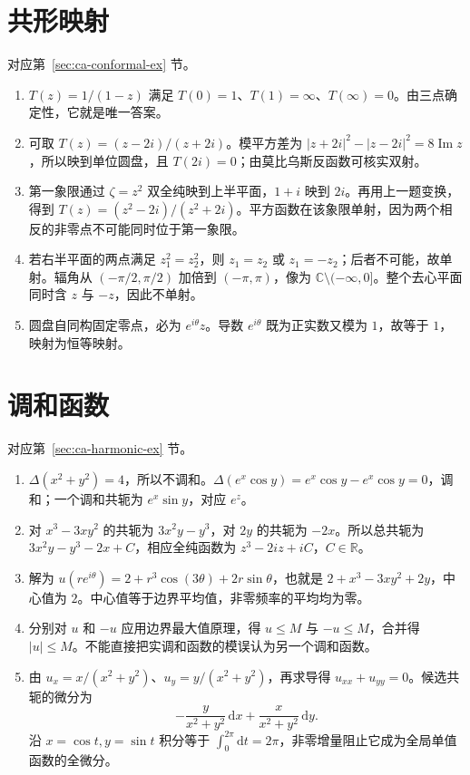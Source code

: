 \section{共形映射}
对应第~\ref{sec:ca-conformal-ex} 节。
\begin{enumerate}
 \item $T(z)=1/(1-z)$ 满足 $T(0)=1$、$T(1)=\infty$、$T(\infty)=0$。由三点确定性，它就是唯一答案。
 \item 可取 $T(z)=(z-2i)/(z+2i)$。模平方差为 $|z+2i|^2-|z-2i|^2=8\operatorname{Im}z$，所以映到单位圆盘，且 $T(2i)=0$；由莫比乌斯反函数可核实双射。
 \item 第一象限通过 $\zeta=z^2$ 双全纯映到上半平面，$1+i$ 映到 $2i$。再用上一题变换，得到 $T(z)=(z^2-2i)/(z^2+2i)$。平方函数在该象限单射，因为两个相反的非零点不可能同时位于第一象限。
 \item 若右半平面的两点满足 $z_1^2=z_2^2$，则 $z_1=z_2$ 或 $z_1=-z_2$；后者不可能，故单射。辐角从 $(-\pi/2,\pi/2)$ 加倍到 $(-\pi,\pi)$，像为 $\mathbb C\setminus(-\infty,0]$。整个去心平面同时含 $z$ 与 $-z$，因此不单射。
 \item 圆盘自同构固定零点，必为 $e^{i\theta}z$。导数 $e^{i\theta}$ 既为正实数又模为 $1$，故等于 $1$，映射为恒等映射。
\end{enumerate}

\section{调和函数}
对应第~\ref{sec:ca-harmonic-ex} 节。
\begin{enumerate}
 \item $\Delta(x^2+y^2)=4$，所以不调和。$\Delta(e^x\cos y)=e^x\cos y-e^x\cos y=0$，调和；一个调和共轭为 $e^x\sin y$，对应 $e^z$。
 \item 对 $x^3-3xy^2$ 的共轭为 $3x^2y-y^3$，对 $2y$ 的共轭为 $-2x$。所以总共轭为 $3x^2y-y^3-2x+C$，相应全纯函数为 $z^3-2iz+iC$，$C\in\mathbb R$。
 \item 解为 $u(re^{i\theta})=2+r^3\cos(3\theta)+2r\sin\theta$，也就是 $2+x^3-3xy^2+2y$，中心值为 $2$。中心值等于边界平均值，非零频率的平均均为零。
 \item 分别对 $u$ 和 $-u$ 应用边界最大值原理，得 $u\le M$ 与 $-u\le M$，合并得 $|u|\le M$。不能直接把实调和函数的模误认为另一个调和函数。
 \item 由 $u_x=x/(x^2+y^2)$、$u_y=y/(x^2+y^2)$，再求导得 $u_{xx}+u_{yy}=0$。候选共轭的微分为
 \[
 -\frac y{x^2+y^2}\,\mathrm dx+\frac x{x^2+y^2}\,\mathrm dy.
 \]
 沿 $x=\cos t,y=\sin t$ 积分等于 $\int_0^{2\pi}\mathrm dt=2\pi$，非零增量阻止它成为全局单值函数的全微分。
\end{enumerate}

